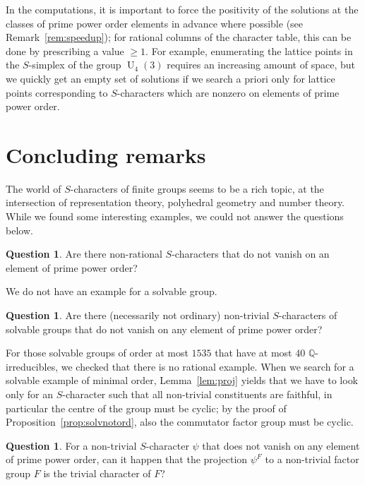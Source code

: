 \documentclass[12pt,leqno,a4paper]{amsart}
\newcommand{\QQ}{{\mathbb{Q}}}
\newcommand{\PSU}{{\operatorname{U}}}
\theoremstyle{definition}
\newtheorem{qst}[thm]{Question}
\begin{document}
In the computations, it is important to force the positivity of the solutions at
the classes of prime power order elements in advance where possible (see
Remark~\ref{rem:speedup}); for
rational columns of the character table, this can be done by prescribing a value
$\geq 1$. For example, enumerating the lattice points in the $S$-simplex of the
group $\PSU_4(3)$ requires an increasing amount of space, but we quickly get an
empty set of solutions if we search a priori only for lattice points
corresponding to $S$-characters which are nonzero on elements of prime power
order.

\section{Concluding remarks}

The world of $S$-characters of finite groups seems to be a rich topic, at the
intersection of representation theory, polyhedral geometry and number theory.
While we found some interesting examples, we could not answer the questions
below.
\begin{qst}
  Are there non-rational $S$-characters that do not vanish on an element of
  prime power order?
\end{qst}

We do not have an example for a solvable group.
\begin{qst}
  Are there (necessarily not ordinary) non-trivial $S$-characters of solvable
  groups that do not vanish on any element of prime power order?
\end{qst}
For those solvable groups of order at most $1535$ that have at most $40$
$\QQ$-irreducibles, we checked that there is no rational example.
When we search for a solvable example of minimal order, Lemma~\ref{lem:proj}
yields that we have to look only for an $S$-character such that all non-trivial
constituents are faithful, in particular the centre of the group must be cyclic;
by the proof of Proposition~\ref{prop:solvnotord}, also the commutator factor
group must be cyclic.

\begin{qst}
  For a non-trivial $S$-character $\psi$ that does not vanish on any element
  of prime power order, can it happen that the projection $\psi^F$ to a
  non-trivial factor group $F$ is the trivial character of $F$?
\end{qst}
\end{document}
